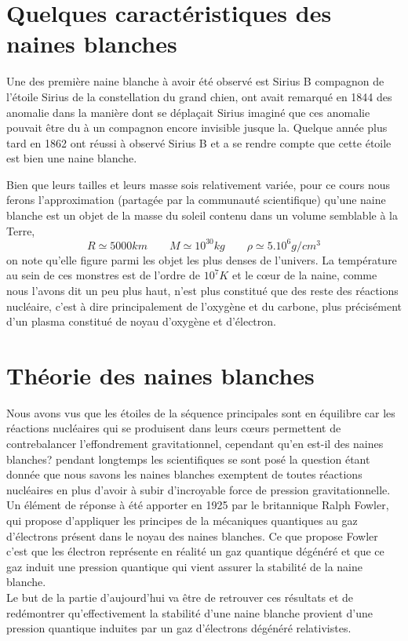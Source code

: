 \documentclass[a4paper]{rapport}
\begin{document}
\section{Quelques caractéristiques des naines blanches}
Une des première naine blanche à avoir été observé est Sirius B compagnon de l'étoile Sirius de la constellation du grand chien, ont avait remarqué en 1844 des anomalie dans la manière dont se déplaçait Sirius imaginé que ces anomalie pouvait être du à un compagnon encore invisible jusque la. Quelque année plus tard en 1862 ont réussi à observé Sirius B et a se rendre compte que cette étoile est bien une naine blanche.
\nl

Bien que leurs tailles et leurs masse sois relativement variée, pour ce cours nous ferons l'approximation (partagée par la communauté scientifique) qu'une naine blanche
est un objet de la masse du soleil contenu dans un volume semblable à la Terre,
$$R\simeq 5000km\qquad M\simeq 10^{30}kg\qquad \rho\simeq 5.10^{6}g/cm^3$$
on note qu'elle figure parmi les objet les plus denses de l'univers.
La température au sein de ces monstres est de l'ordre de $10^7 K$ et le cœur de la naine, comme nous l'avons dit un peu plus haut, n'est plus constitué que des reste des réactions nucléaire, c'est à dire principalement de l'oxygène et du carbone, plus précisément d'un plasma constitué de noyau d'oxygène et d'électron.

\section{Théorie des naines blanches}
Nous avons vus que les étoiles de la séquence principales sont en équilibre car les réactions nucléaires qui se produisent dans leurs cœurs permettent de contrebalancer l'effondrement gravitationnel, cependant qu'en est-il des naines blanches? pendant longtemps les scientifiques se sont posé la question étant donnée que nous savons les naines blanches exemptent de toutes réactions nucléaires en plus d'avoir à subir d'incroyable force de pression gravitationnelle.\\
Un élément de réponse à été apporter en 1925 par le britannique Ralph Fowler, qui propose d'appliquer les principes de la mécaniques quantiques au gaz d'électrons présent dans le noyau des naines blanches. Ce que propose Fowler c'est que les électron représente en réalité un gaz quantique dégénéré et que ce gaz induit une pression quantique qui vient assurer la stabilité de la naine blanche.\\
Le but de la partie d'aujourd'hui va être de retrouver ces résultats et de redémontrer qu'effectivement la stabilité d'une naine blanche provient d'une pression quantique induites par un gaz d'électrons dégénéré relativistes.
\end{document}
